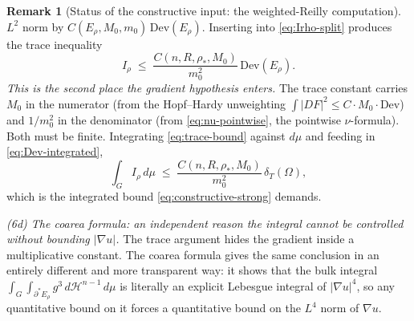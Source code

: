 \documentclass[11pt]{amsart}
\theoremstyle{definition}
\newtheorem{remark}[theorem]{Remark}
\newcommand{\Om}{\Omega}
\newcommand{\dT}{\delta_T}
\newcommand{\rstar}{\rho_*}
\newcommand{\Hn}{\mathcal H^{n-1}}
\begin{document}
\begin{remark}[Status of the constructive input: the weighted-Reilly computation]
\(L^2\) norm by \(C(E_\rho,M_0,m_0)\,\mathrm{Dev}(E_\rho)\).  Inserting into
\eqref{eq:Irho-split} produces the trace inequality
\begin{equation}\label{eq:trace-bound}
   I_\rho\;\le\;\frac{C(n,R,\rstar,M_0)}{m_0^2}\,\mathrm{Dev}(E_\rho).
\end{equation}
\emph{This is the second place the gradient hypothesis enters.}  The trace
constant carries \(M_0\) in the numerator (from the Hopf--Hardy unweighting
\(\int|DF|^2\le C\cdot M_0\cdot\mathrm{Dev}\)) and \(1/m_0^2\) in the
denominator (from \eqref{eq:nu-pointwise}, the pointwise \(\nu\)-formula).
Both must be finite.  Integrating \eqref{eq:trace-bound} against \(d\mu\) and
feeding in \eqref{eq:Dev-integrated},
\[
   \int_G I_\rho\,d\mu\;\le\;\frac{C(n,R,\rstar,M_0)}{m_0^2}\,\dT(\Om) ,
\]
which is the integrated bound \eqref{eq:constructive-strong} demands.

\emph{(6d) The coarea formula: an independent reason the integral cannot be
controlled without bounding \(|\nabla u|\).}
The trace argument hides the gradient inside a multiplicative constant.  The
coarea formula gives the same conclusion in an entirely different and more
transparent way: it shows that the bulk integral
\(\int_G\!\int_{\partial^*E_\rho}g^3\,d\Hn\,d\mu\) is literally an explicit
Lebesgue integral of \(|\nabla u|^4\), so any quantitative bound on it forces a
quantitative bound on the \(L^4\) norm of \(\nabla u\).


\end{remark}
\end{document}
